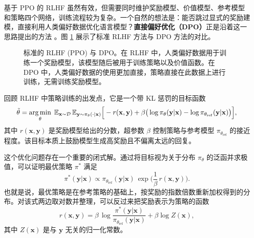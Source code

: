 \label{sec:dpo}

基于 PPO 的 RLHF 虽然有效，但需要同时维护奖励模型、价值模型、参考模型和策略四个网络，训练流程较为复杂。一个自然的想法是：能否跳过显式的奖励建模，直接利用人类偏好数据优化语言模型？\textbf{直接偏好优化（DPO）}正是沿着这一思路提出的方法 \cite{rafailov-etal:2024direct}。图 \ref{fig:rlhf-vs-dpo} 展示了标准 RLHF 方法与 DPO 方法的对比。

\begin{figure}[!t]
\centering

\caption{标准的 RLHF (PPO) 与 DPO。在 RLHF 中，人类偏好数据用于训练一个奖励模型，该模型随后被用于训练策略以及价值函数。在 DPO 中，人类偏好数据的使用更加直接，策略直接在此数据上进行训练，无需训练奖励模型。}
\label{fig:rlhf-vs-dpo}
\end{figure}

回顾 RLHF 中策略训练的出发点，它是一个带 KL 惩罚的目标函数
\begin{equation}
\tilde{\theta} = \operatorname*{arg\,min}_{\theta}\; \mathbb{E}_{\mathbf{x}\sim\mathcal{D}}\,
\mathbb{E}_{\mathbf{y}\sim\pi_{\theta}(\cdot|\mathbf{x})}\Big[
-r(\mathbf{x},\mathbf{y}) + \beta\big(\log\pi_{\theta}(\mathbf{y}|\mathbf{x}) - \log\pi_{\theta_{\mathrm{ref}}}(\mathbf{y}|\mathbf{x})\big)
\Big],
\label{eq:dpo-start}
\end{equation}
其中 $r(\mathbf{x},\mathbf{y})$ 是奖励模型给出的分数，超参数 $\beta$ 控制策略与参考模型 $\pi_{\theta_{\mathrm{ref}}}$ 的接近程度。该目标本质上鼓励模型生成高奖励且不偏离太远的回复。

这个优化问题存在一个重要的闭式解。通过将目标视为关于分布 $\pi_{\theta}$ 的泛函并求极值，可以证明最优策略 $\pi^*$ 满足
\begin{equation}
\pi^*(\mathbf{y}|\mathbf{x}) \propto \pi_{\theta_{\mathrm{ref}}}(\mathbf{y}|\mathbf{x})\,
\exp\!\Big(\frac{1}{\beta}\,r(\mathbf{x},\mathbf{y})\Big).
\label{eq:dpo-optimal-policy}
\end{equation}
也就是说，最优策略是在参考策略的基础上，按奖励的指数倍数重新加权得到的分布。对该式两边取对数并整理，可以反过来把奖励表示为策略的函数
\begin{equation}
r(\mathbf{x},\mathbf{y}) = \beta\,\log\frac{\pi^*(\mathbf{y}|\mathbf{x})}{\pi_{\theta_{\mathrm{ref}}}(\mathbf{y}|\mathbf{x})} + \beta\log Z(\mathbf{x}),
\label{eq:dpo-reward}
\end{equation}
其中 $Z(\mathbf{x})$ 是与 $\mathbf{y}$ 无关的归一化常数。

